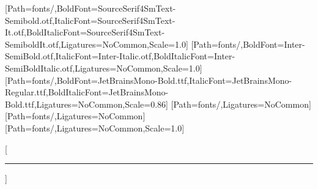 \usepackage{titlesec}
\usepackage{enumitem}
\usepackage{fancyhdr}
\usepackage{lastpage}
\usepackage{refcount}
\usepackage{xurl}
\setmainfont{SourceSerif4SmText-Regular.otf}[Path=fonts/,BoldFont=SourceSerif4SmText-Semibold.otf,ItalicFont=SourceSerif4SmText-It.otf,BoldItalicFont=SourceSerif4SmText-SemiboldIt.otf,Ligatures=NoCommon,Scale=1.0]
\setsansfont{Inter-Regular.otf}[Path=fonts/,BoldFont=Inter-SemiBold.otf,ItalicFont=Inter-Italic.otf,BoldItalicFont=Inter-SemiBoldItalic.otf,Ligatures=NoCommon,Scale=1.0]
\setmonofont{JetBrainsMono-Regular.ttf}[Path=fonts/,BoldFont=JetBrainsMono-Bold.ttf,ItalicFont=JetBrainsMono-Regular.ttf,BoldItalicFont=JetBrainsMono-Bold.ttf,Ligatures=NoCommon,Scale=0.86]
\newfontfamily{}[Path=fonts/,Ligatures=NoCommon]
\newfontfamily{}[Path=fonts/,Ligatures=NoCommon]
\newfontfamily{}[Path=fonts/,Ligatures=NoCommon,Scale=1.0]
\renewcommand{\normalsize}{\fontsize{10.75pt}{14.75pt}\selectfont}
\setlength{\parskip}{5pt}
\setlength{\parindent}{0pt}
\AtBeginDocument{\raggedright\hyphenpenalty=10000\exhyphenpenalty=10000\emergencystretch=1.5em\color{BobInk}\normalsize}
\renewcommand{\maketitle}{}
\titleformat{\section}{\sffamily\bfseries\fontsize{15pt}{18pt}\selectfont\color{BobInk}}{}{0pt}{}[\vspace{2pt}\textcolor{BobRule}{\rule{\linewidth}{0.6pt}}]

